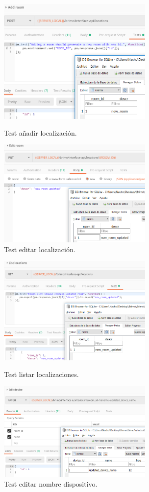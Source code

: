 \begin{figure}[!htb]
\includegraphics[width=3.00in]{images/tests/screenshots/9addroom.PNG}
\caption{Test añadir localización.}
\endminipage\hfill
{}
\includegraphics[width=3.00in]{images/tests/screenshots/10editroom.PNG}
\caption{Test editar localización.}
\endminipage\hfill
\end{figure}

\begin{figure}[!htb]
\includegraphics[width=3.00in]{images/tests/screenshots/11listlocations.PNG}
\caption{Test listar localizaciones.}
\endminipage\hfill
{}
\includegraphics[width=3.00in]{images/tests/screenshots/12editdevice.PNG}
\caption{Test editar nombre dispositivo.}
\endminipage\hfill
\end{figure}


